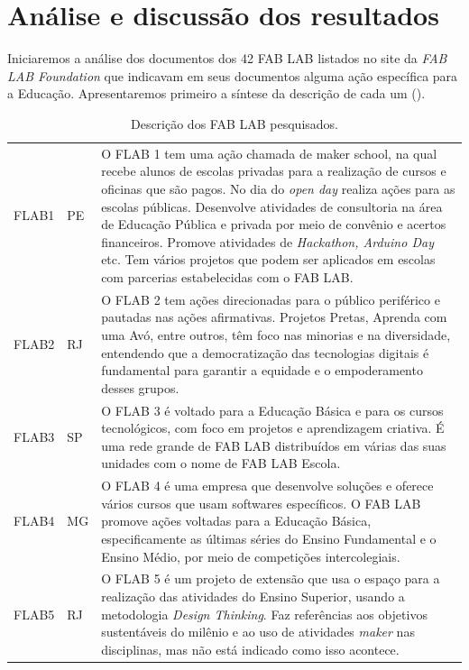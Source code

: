 \documentclass[portuguese]{textolivre}
\begin{document}
\section{Análise e discussão dos resultados}\label{sec-fmt-manuscrito}
Iniciaremos a análise dos documentos dos 42 FAB LAB listados no site da \textit{FAB LAB Foundation} que indicavam em seus documentos alguma ação específica para a Educação. Apresentaremos primeiro a síntese da descrição de cada um ().

\needspace{5cm}
\begin{footnotesize}
\begin{longtable}{p{1cm} p{1cm} p{11.5cm}}
\caption{Descrição dos FAB LAB pesquisados.}
\label{tbl2}
\\
\toprule
FLAB1 & PE & O FLAB 1 tem uma ação chamada de maker school, na qual recebe alunos de escolas privadas para a realização de cursos e oficinas que são pagos. No dia do \textit{open day} realiza ações para as escolas públicas. Desenvolve atividades de consultoria na área de Educação Pública e privada por meio de convênio e acertos financeiros. Promove atividades de \textit{Hackathon, Arduino Day} etc. Tem vários projetos que podem ser aplicados em escolas com parcerias estabelecidas com o FAB LAB. \\
FLAB2 & RJ & O FLAB 2 tem ações direcionadas para o público periférico e pautadas nas ações afirmativas. Projetos Pretas, Aprenda com uma Avó, entre outros, têm foco nas minorias e na diversidade, entendendo que a democratização das tecnologias digitais é fundamental para garantir a equidade e o empoderamento desses grupos. \\
FLAB3 & SP & O FLAB 3 é voltado para a Educação Básica e para os cursos tecnológicos, com foco em projetos e aprendizagem criativa. É uma rede grande de FAB LAB distribuídos em várias das suas unidades com o nome de FAB LAB Escola. \\
FLAB4 & MG & O FLAB 4 é uma empresa que desenvolve soluções e oferece vários cursos que usam softwares específicos. O FAB LAB promove ações voltadas para a Educação Básica, especificamente as últimas séries do Ensino Fundamental e o Ensino Médio, por meio de competições intercolegiais. \\
FLAB5 & RJ & O FLAB 5 é um projeto de extensão que usa o espaço para a realização das atividades do Ensino Superior, usando a metodologia \textit{Design Thinking}. Faz referências aos objetivos sustentáveis do milênio e ao uso de atividades \textit{maker} nas disciplinas, mas não está indicado como isso acontece. \\

\end{longtable}
\end{footnotesize}
\end{document}
